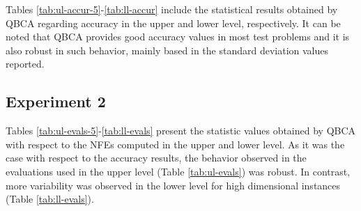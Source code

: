 \documentclass[conference]{IEEEtran}
\theoremstyle{definition}
\begin{document}
Tables \ref{tab:ul-accur-5}-\ref{tab:ll-accur} include the statistical results
obtained by QBCA regarding accuracy in the upper and lower level, respectively.
It can be noted that QBCA provides good accuracy values in most test problems
and it is also robust in such behavior, mainly based in the standard deviation
values reported. 
% 
% 



\subsection{Experiment 2}
Tables \ref{tab:ul-evals-5}-\ref{tab:ll-evals} present the statistic values
obtained by QBCA with respect to the NFEs computed in the upper and lower level.
As it was the case with respect to the accuracy results, the behavior
observed in the evaluations used in the upper level (Table \ref{tab:ul-evals})
was robust. In contrast, more variability was observed in the lower level
for high dimensional instances (Table \ref{tab:ll-evals}). 
\end{document}
